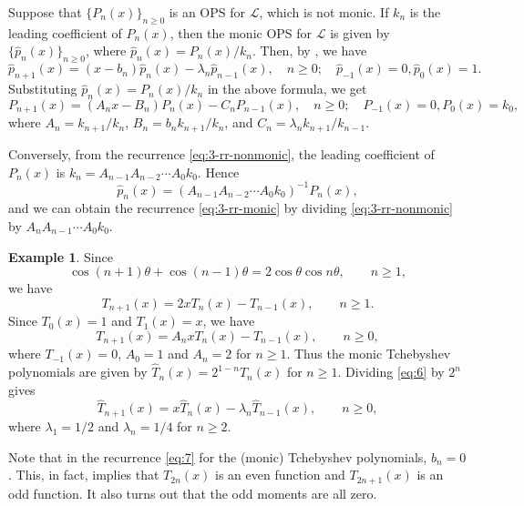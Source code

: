 \documentclass[oneside]{book}
\numberwithin{equation}{section}
\theoremstyle{definition}
\newtheorem{exam}[thm]{Example}
\newcommand\LL{\mathcal{L}}
\begin{document}
Suppose that \( \{ P_n(x) \}_{n\ge 0} \) is an OPS for \( \LL \),
which is not monic. If \( k_n \) is the leading coefficient of
\( P_n(x) \), then the monic OPS for \( \LL \) is given by
\( \{ \hat{p}_n(x) \}_{n\ge 0} \), where
\( \hat{p}_n(x) = P_n(x)/k_n \).
Then, by , we have
\begin{equation}\label{eq:3-rr-monic}
  \hat{p}_{n+1}(x) = (x-b_n) \hat{p}_n(x) - \lambda_n
  \hat{p}_{n-1}(x), \quad n\ge0; \quad \hat{p}_{-1}(x) = 0, \hat{p}_{0}(x) = 1.
\end{equation}
Substituting \( \hat{p}_n(x) = P_n(x)/k_n \) in the above formula, we get
\begin{equation}\label{eq:3-rr-nonmonic}
  P_{n+1}(x) = (A_nx-B_n) P_n(x) - C_n P_{n-1}(x), \quad n\ge0; \quad P_{-1}(x) = 0, P_{0}(x) = k_0,
\end{equation}
where \( A_n = k_{n+1}/k_n \), \( B_n = b_nk_{n+1}/k_n \), and
\( C_n = \lambda_nk_{n+1}/k_{n-1} \).

Conversely, from the recurrence \eqref{eq:3-rr-nonmonic}, the leading
coefficient of \( P_n(x) \) is
\( k_n = A_{n-1}A_{n-2} \cdots A_0 k_0 \). Hence
\[
  \hat{p}_n(x) = (A_{n-1}A_{n-2} \cdots A_0 k_0)^{-1} P_n(x),
\]
and we can obtain the recurrence \eqref{eq:3-rr-monic} by dividing
\eqref{eq:3-rr-nonmonic} by \( A_{n}A_{n-1} \cdots A_0 k_0 \).

\begin{exam}
  Since
  \[
    \cos(n+1)\theta + \cos(n-1)\theta
    = 2 \cos\theta \cos n\theta, \qquad n\ge1,
  \]
  we have
  \[
    T_{n+1}(x) = 2 x T_n(x) - T_{n-1}(x) , \qquad n\ge1.
  \]
  Since \( T_{0}(x)=1 \) and \( T_{1}(x)=x \), we have
  \begin{equation}\label{eq:6}
    T_{n+1}(x) = A_n x T_n(x) - T_{n-1}(x), \qquad n\ge0,
  \end{equation}
  where \( T_{-1}(x) = 0 \), \( A_0=1 \) and \( A_n=2 \) for
  \( n\ge1 \). Thus the monic Tchebyshev polynomials are given by
  \( \hat{T}_n(x) = 2^{1-n} T_n(x) \) for \( n\ge1 \).
  Dividing \eqref{eq:6} by \( 2^n \) gives
  \begin{equation}\label{eq:7}
    \hat{T}_{n+1}(x) = x \hat{T}_n(x) - \lambda_n\hat{T}_{n-1}(x), \qquad n\ge0,
  \end{equation}
  where \( \lambda_1 = 1/2 \) and \( \lambda_n = 1/4 \) for \( n\ge2 \).
\end{exam}

Note that in the recurrence \eqref{eq:7} for the (monic) Tchebyshev
polynomials, \( b_n = 0 \). This, in fact, implies that
\( T_{2n}(x) \) is an even function and \( T_{2n+1}(x) \) is an odd
function. It also turns out that the odd moments are all zero.
\end{document}
